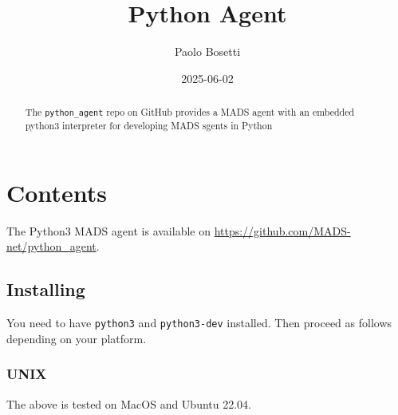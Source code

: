 \documentclass[
  letterpaper,
  DIV=11,
  numbers=noendperiod]{scrartcl}
\title{Python Agent}
\author{Paolo Bosetti}
\date{2025-06-02}
\newenvironment{Shaded}{\begin{snugshade}}{\end{snugshade}}
\newcommand{\AttributeTok}[1]{\textcolor[rgb]{0.40,0.45,0.13}{#1}}
\newcommand{\BuiltInTok}[1]{\textcolor[rgb]{0.00,0.23,0.31}{#1}}
\newcommand{\CommentTok}[1]{\textcolor[rgb]{0.37,0.37,0.37}{#1}}
\newcommand{\ExtensionTok}[1]{\textcolor[rgb]{0.00,0.23,0.31}{#1}}
\newcommand{\FunctionTok}[1]{\textcolor[rgb]{0.28,0.35,0.67}{#1}}
\newcommand{\NormalTok}[1]{\textcolor[rgb]{0.00,0.23,0.31}{#1}}
\newcommand{\OperatorTok}[1]{\textcolor[rgb]{0.37,0.37,0.37}{#1}}
\newcommand{\StringTok}[1]{\textcolor[rgb]{0.13,0.47,0.30}{#1}}
\newcommand{\VariableTok}[1]{\textcolor[rgb]{0.07,0.07,0.07}{#1}}
\renewcommand*\contentsname{Table of contents}
\newcommand\contentsname{Table of contents}
\begin{document}
\maketitle
\begin{abstract}
The \texttt{python\_agent} repo on GitHub provides a MADS agent with an
embedded python3 interpreter for developing MADS sgents in Python
\end{abstract}

\renewcommand*\contentsname{Table of contents}
{
\hypersetup{linkcolor=}
\setcounter{tocdepth}{3}
\tableofcontents
}

\section{Contents}\label{contents}

The Python3 MADS agent is available on
\url{https://github.com/MADS-net/python_agent}.

\subsection{Installing}\label{installing}

You need to have \texttt{python3} and \texttt{python3-dev} installed.
Then proceed as follows depending on your platform.

\subsubsection{UNIX}\label{unix}

\begin{Shaded}
\end{Shaded}

The above is tested on MacOS and Ubuntu 22.04.
\end{document}
